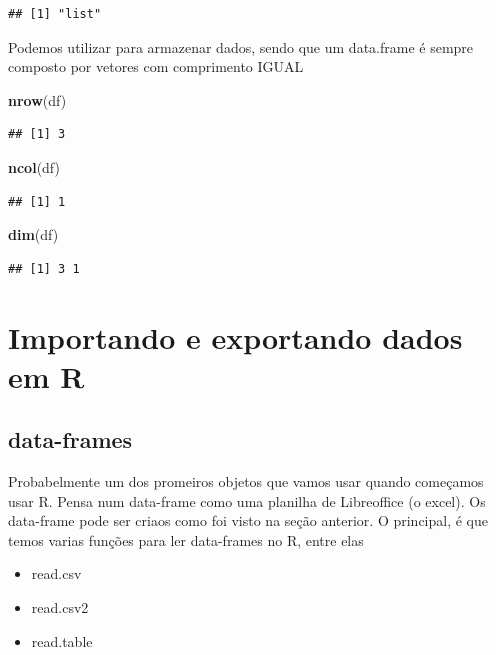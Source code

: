 \documentclass[]{book}
\newenvironment{Shaded}{\begin{snugshade}}{\end{snugshade}}
\newcommand{\KeywordTok}[1]{\textcolor[rgb]{0.13,0.29,0.53}{\textbf{#1}}}
\newcommand{\NormalTok}[1]{#1}
\providecommand{\tightlist}{%
  \setlength{\itemsep}{0pt}\setlength{\parskip}{0pt}}
\begin{document}
\begin{verbatim}
## [1] "list"
\end{verbatim}

Podemos utilizar para armazenar dados, sendo que um data.frame é sempre
composto por vetores com comprimento IGUAL

\begin{Shaded}
\begin{Highlighting}[]
\KeywordTok{nrow}\NormalTok{(df)}
\end{Highlighting}
\end{Shaded}

\begin{verbatim}
## [1] 3
\end{verbatim}

\begin{Shaded}
\begin{Highlighting}[]
\KeywordTok{ncol}\NormalTok{(df)}
\end{Highlighting}
\end{Shaded}

\begin{verbatim}
## [1] 1
\end{verbatim}

\begin{Shaded}
\begin{Highlighting}[]
\KeywordTok{dim}\NormalTok{(df)}
\end{Highlighting}
\end{Shaded}

\begin{verbatim}
## [1] 3 1
\end{verbatim}

\chapter{Importando e exportando dados em
R}\label{importando-e-exportando-dados-em-r}

\section{data-frames}\label{data-frames}

Probabelmente um dos promeiros objetos que vamos usar quando começamos
usar R. Pensa num data-frame como uma planilha de Libreoffice (o excel).
Os data-frame pode ser criaos como foi visto na seção anterior. O
principal, é que temos varias funções para ler data-frames no R, entre
elas

\begin{itemize}
\tightlist
\item
  read.csv
\item
  read.csv2
\item
  read.table
\end{itemize}
\end{document}
